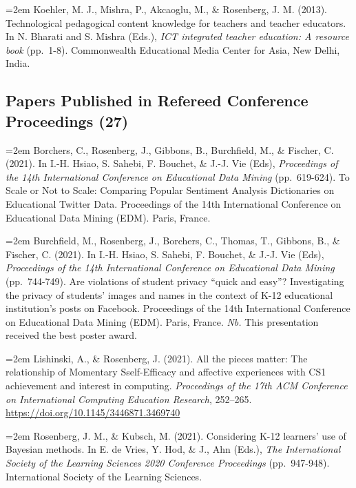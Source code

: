 \documentclass[
  14,
]{article}
\begin{document}
\hangindent=2em Koehler, M. J., Mishra, P., Akcaoglu, M., \& Rosenberg,
J. M. (2013). Technological pedagogical content knowledge for teachers
and teacher educators. In N. Bharati and S. Mishra (Eds.), \emph{ICT
integrated teacher education: A resource book} (pp.~1-8). Commonwealth
Educational Media Center for Asia, New Delhi, India.

\hypertarget{papers-published-in-refereed-conference-proceedings-27}{%
\subsection{Papers Published in Refereed Conference Proceedings
(27)}\label{papers-published-in-refereed-conference-proceedings-27}}

\hangindent=2em Borchers, C., Rosenberg, J., Gibbons, B., Burchfield,
M., \& Fischer, C. (2021). In I.-H. Hsiao, S. Sahebi, F. Bouchet, \&
J.-J. Vie (Eds), \emph{Proceedings of the 14th International Conference
on Educational Data Mining} (pp.~619-624). To Scale or Not to Scale:
Comparing Popular Sentiment Analysis Dictionaries on Educational Twitter
Data. Proceedings of the 14th International Conference on Educational
Data Mining (EDM). Paris, France.

\hangindent=2em Burchfield, M., Rosenberg, J., Borchers, C., Thomas, T.,
Gibbons, B., \& Fischer, C. (2021). In I.-H. Hsiao, S. Sahebi, F.
Bouchet, \& J.-J. Vie (Eds), \emph{Proceedings of the 14th International
Conference on Educational Data Mining} (pp.~744-749). Are violations of
student privacy ``quick and easy''? Investigating the privacy of
students' images and names in the context of K-12 educational
institution's posts on Facebook. Proceedings of the 14th International
Conference on Educational Data Mining (EDM). Paris, France. \emph{Nb.}
This presentation received the best poster award.

\hangindent=2em Lishinski, A., \& Rosenberg, J. (2021). All the pieces
matter: The relationship of Momentary Sself-Efficacy and affective
experiences with CS1 achievement and interest in computing.
\emph{Proceedings of the 17th ACM Conference on International Computing
Education Research}, 252--265.
\url{https://doi.org/10.1145/3446871.3469740}

\hangindent=2em Rosenberg, J. M., \& Kubsch, M. (2021). Considering K-12
learners' use of Bayesian methods. In E. de Vries, Y. Hod, \& J., Ahn
(Eds.), \emph{The International Society of the Learning Sciences 2020
Conference Proceedings} (pp.~947-948). International Society of the
Learning Sciences.
\end{document}
